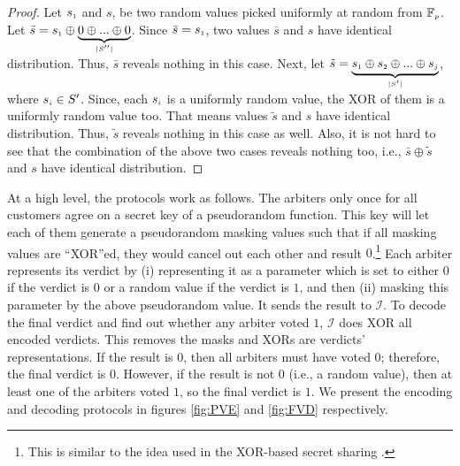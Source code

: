 \begin{proof}
Let $s_{\scriptscriptstyle 1}$ and $s$, be two random values picked uniformly at random from $\mathbb{F}_{\scriptscriptstyle p}$. Let $\bar s=s_{\scriptscriptstyle 1}\oplus \underbrace{0\oplus... \oplus 0}_{\scriptscriptstyle |S''|}$. Since  $\bar s=s_{\scriptscriptstyle 1}$, two values $\bar s$ and $s$ have identical distribution. Thus, $\bar s$ reveals nothing in this case. Next, let $\tilde s=\underbrace{ s_{\scriptscriptstyle 1}\oplus s_{\scriptscriptstyle 2}\oplus... \oplus s_{\scriptscriptstyle j}}_{\scriptscriptstyle |S'|}$, where $s_{\scriptscriptstyle i}\in S'$. Since, each $s_{\scriptscriptstyle i}$ is a uniformly random value,  the XOR of them is a uniformly random value too. That means values $\tilde s$ and $s$ have identical distribution. Thus, $\tilde s$ reveals nothing in this case as well. Also, it is not hard to see that the combination of the above two cases reveals nothing too, i.e., $\bar s\oplus \tilde s$ and $s$ have    identical distribution. 
%
\end{proof}


At a high level, the protocols work as follows.  The arbiters only once for all customers agree on a secret key of a pseudorandom function. This key will let each of them   generate a pseudorandom masking values such that if all masking values are ``XOR''ed, they would cancel out each other and result $0$.\footnote{This is similar to the idea used in the XOR-based secret sharing \cite{Schneier0078909}.} Each arbiter represents its verdict by (i) representing it as a parameter which is set to either $0$ if the verdict is $0$ or a random value if the verdict is $1$, and then (ii) masking this parameter by the above  pseudorandom value.  It sends the result to $\mathcal{I}$.  To decode the final verdict and find out whether any arbiter voted $1$, $\mathcal{I}$  does XOR all encoded verdicts. This removes the masks and XORs are verdicts' representations.  If the result is $0$, then    all arbiters must have voted $0$; therefore,  the final verdict is $0$. However, if the result is not $0$ (i.e., a random value), then at least one of the arbiters voted $1$, so  the final verdict is $1$. We present the encoding  and decoding protocols in figures \ref{fig:PVE} and \ref{fig:FVD} respectively.
 
